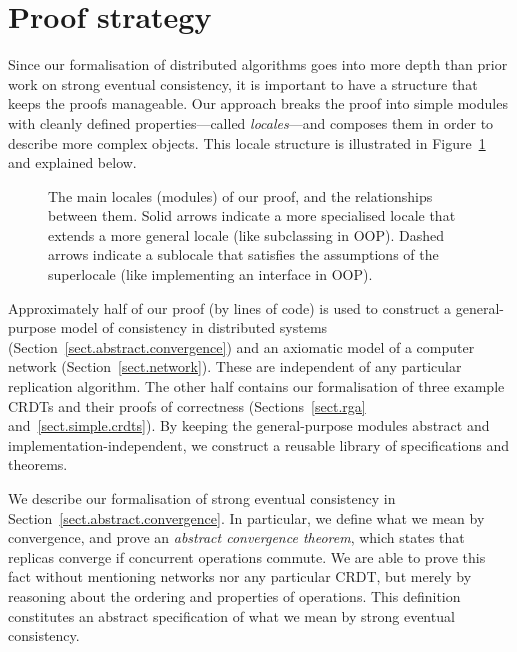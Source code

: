 \section{Proof strategy}
\label{sect.high-level.proof.strategy}

Since our formalisation of distributed algorithms goes into more depth than prior work on strong eventual consistency, it is important to have a structure that keeps the proofs manageable.
Our approach breaks the proof into simple modules with cleanly defined properties---called \emph{locales}---and composes them in order to describe more complex objects.
This locale structure is illustrated in Figure~\ref{fig.proof.structure} and explained below.

\begin{figure}
\centering

\caption{The main locales (modules) of our proof, and the relationships between them.
Solid arrows indicate a more specialised locale that extends a more general locale (like subclassing in OOP).
Dashed arrows indicate a sublocale that satisfies the assumptions of the superlocale (like implementing an interface in OOP).
}\label{fig.proof.structure}
\end{figure}

Approximately half of our proof (by lines of code) is used to construct a general-purpose model of consistency in distributed systems (Section~\ref{sect.abstract.convergence}) and an axiomatic model of a computer network (Section~\ref{sect.network}). 
These are independent of any particular replication algorithm.
The other half contains our formalisation of three example CRDTs and their proofs of correctness (Sections~\ref{sect.rga} and~\ref{sect.simple.crdts}).
By keeping the general-purpose modules abstract and implementation-independent, we construct a reusable library of specifications and theorems.

We describe our formalisation of strong eventual consistency in Section~\ref{sect.abstract.convergence}.
In particular, we define what we mean by convergence, and prove an \emph{abstract convergence theorem}, which states that replicas converge if concurrent operations commute.
We are able to prove this fact without mentioning networks nor any particular CRDT, but merely by reasoning about the ordering and properties of operations.
This definition constitutes an abstract specification of what we mean by strong eventual consistency.

